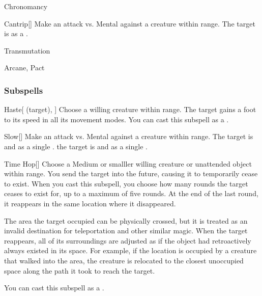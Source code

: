 \newpage
\begin{spellsection}{Chronomancy}

\begin{spellheader}
\end{spellheader}


\begin{ability}{Cantrip}[]
Make an attack vs. Mental against a creature within \rngmed range.
\hit The target is  as a .
\end{ability}




 Transmutation

 Arcane, Pact
\end{spellsection}


\subsubsection{Subspells}


\begin{ability}[\nth{1}]{Haste}[ (target), ]
Choose a willing creature within \rngmed range.
The target gains a  foot  to its speed in all its movement modes.
You can cast this subspell as a .
\end{ability}
\vspace{0.25em}


\begin{ability}[\nth{1}]{Slow}[]
Make an attack vs. Mental against a creature within \rngmed range.
\hit The target is  and  as a single .
\crit the target is  and  as a single .
\end{ability}
\vspace{0.25em}


\begin{ability}[\nth{2}]{Time Hop}[]
Choose a Medium or smalller willing creature or unattended object within \rngmed range.
You send the target into the future, causing it to temporarily cease to exist.
When you cast this subspell, you choose how many rounds the target ceases to exist for, up to a maximum of five rounds.
At the end of the last round, it reappears in the same location where it disappeared.

The area the target occupied can be physically crossed, but it is treated as an invalid destination for teleportation and other similar magic.
When the target reappears, all of its surroundings are adjusted as if the object had retroactively always existed in its space.
For example, if the location is occupied by a creature that walked into the area, the creature is relocated to the closest unoccupied space along the path it took to reach the target.

You can cast this subspell as a .
\end{ability}
\vspace{0.25em}


